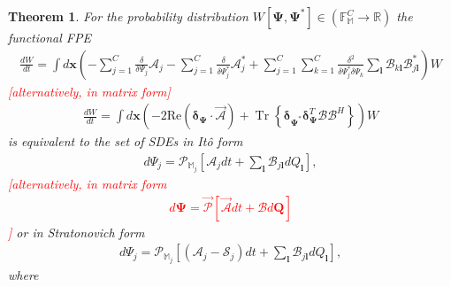 \documentclass[12pt,aip,jmp,amssymb,amsmath]{revtex4-1}
\newcommand{\todo}[1]{\textcolor{red}{[#1]}}
\newcommand{\lvec}{\boldsymbol{l}}
\newcommand{\xvec}{\boldsymbol{x}}
\newcommand{\bdelta}{\boldsymbol{\delta}}
\newcommand{\bPsi}{\boldsymbol{\Psi}}
\newcommand{\Trace}[1]{\operatorname{Tr} \left\{ #1 \right\}}
\newcommand{\Real}{\mathrm{Re}}
\newcommand{\Psivec}{\boldsymbol{\Psi}}
\newcommand{\restbasis}{\mathbb{M}}
\newtheorem{theorem}{Theorem}
\begin{document}
\begin{theorem}
\label{thm:app-fpe:fpe-sde-func}
    For the probability distribution $W[\Psivec, \Psivec^*] \in (\mathbb{F}_{\restbasis}^C \rightarrow \mathbb{R})$ the functional FPE
    \begin{equation*}\begin{split}
        \frac{dW}{dt}
        = \int d\xvec \left(
            - \sum_{j=1}^C \frac{\delta}{\delta \Psi_j} \mathcal{A}_j
            - \sum_{j=1}^C \frac{\delta}{\delta \Psi_j^*} \mathcal{A}_j^*
            + \sum_{j=1}^C \sum_{k=1}^C \frac{\delta^2}{\delta \Psi_j^* \delta \Psi_k}
                \sum_{\lvec} \mathcal{B}_{k \lvec} \mathcal{B}_{j \lvec}^*
        \right) W
    \end{split}\end{equation*}
    \todo{alternatively, in matrix form}
    \begin{equation*}\begin{split}
        \frac{dW}{dt}
        = \int d\xvec \left(
            - 2 \Real \left( \bdelta_{\bPsi} \cdot \vec{\mathcal{A}} \right)
            + \Trace{ \bdelta_{\bPsi^*} \bdelta_{\bPsi}^T \mathcal{B} \mathcal{B}^H }
        \right) W
    \end{split}\end{equation*}
    is equivalent to the set of SDEs in It\^{o} form
    \begin{equation*}\begin{split}
        d\Psi_j = \mathcal{P}_{\restbasis_j} \left[
            \mathcal{A}_j dt + \sum_{\lvec} \mathcal{B}_{j \lvec} dQ_{\lvec}
        \right],
    \end{split}\end{equation*}
    \todo{alternatively, in matrix form
    \begin{equation*}\begin{split}
        d\bPsi = \vec{\mathcal{P}} \left[
            \vec{\mathcal{A}} dt + \mathcal{B} d\boldsymbol{Q}
        \right]
    \end{split}\end{equation*}
    }
    or in Stratonovich form
    \begin{equation*}\begin{split}
        d\Psi_j = \mathcal{P}_{\restbasis_j} \left[
            (\mathcal{A}_j - \mathcal{S}_j) dt + \sum_{\lvec} \mathcal{B}_{j \lvec} dQ_{\lvec}
        \right],
    \end{split}\end{equation*}
    where
    \begin{equation*}\begin{split}

\end{split}
\end{equation*}
\end{theorem}
\end{document}
